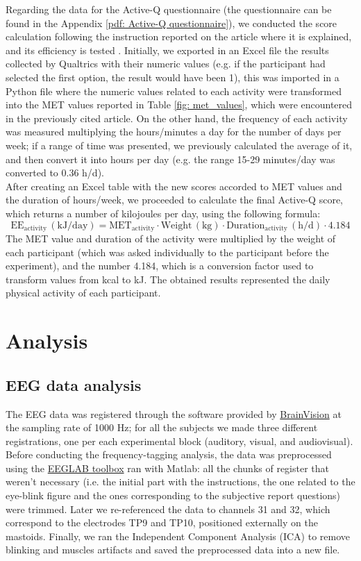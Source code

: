 Regarding the data for the Active-Q questionnaire (the questionnaire can be found in the Appendix \ref{pdf: Active-Q questionnaire}), we conducted the score calculation following the instruction reported on the article where it is explained, and its efficiency is tested \parencite{Bonn_2012}. Initially, we exported in an Excel file the results collected by Qualtrics with their numeric values (e.g. if the participant had selected the first option, the result would have been 1), this was imported in a Python file where the numeric values related to each activity were transformed into the MET values reported in Table \ref{fig: met_values}, which were encountered in the previously cited article. On the other hand, the frequency of each activity was measured multiplying the hours/minutes a day for the number of days per week; if a range of time was presented, we previously calculated the average of it, and then convert it into hours per day (e.g. the range 15-29 minutes/day was converted to 0.36 h/d).  \\
After creating an Excel table with the new scores accorded to MET values and the duration of hours/week, we proceeded to calculate the final Active-Q score, which returns a number of kilojoules per day, using the following formula: 
\[
\text{EE}_{\text{activity}} \, (\text{kJ/day}) = \text{MET}_{\text{activity}} \cdot \text{Weight} \, (\text{kg}) \cdot \text{Duration}_{\text{activity}} \, (\text{h/d}) \cdot 4.184
\]
The MET value and duration of the activity were multiplied by the weight of each participant (which was asked individually to the participant before the experiment), and the number 4.184, which is a conversion factor used to transform values from kcal to kJ. The obtained results represented the daily physical activity of each participant.

\section{Analysis}
\subsection{EEG data analysis}
The EEG data was registered through the software provided by \href{https://brainvision.com/applications/brain-vision-software/}{BrainVision} at the sampling rate of 1000 Hz; for all the subjects we made three different registrations, one per each experimental block (auditory, visual, and audiovisual). \\
Before conducting the frequency-tagging analysis, the data was preprocessed using the \href{https://eeglab.org/}{EEGLAB toolbox} ran with Matlab: all the chunks of register that weren't necessary (i.e. the initial part with the instructions, the one related to the eye-blink figure and the ones corresponding to the subjective report questions) were trimmed. Later we re-referenced the data to channels 31 and 32, which correspond to the electrodes TP9 and TP10, positioned externally on the mastoids. Finally, we ran the Independent Component Analysis (ICA) to remove blinking and muscles artifacts and saved the preprocessed data into a new file. 

